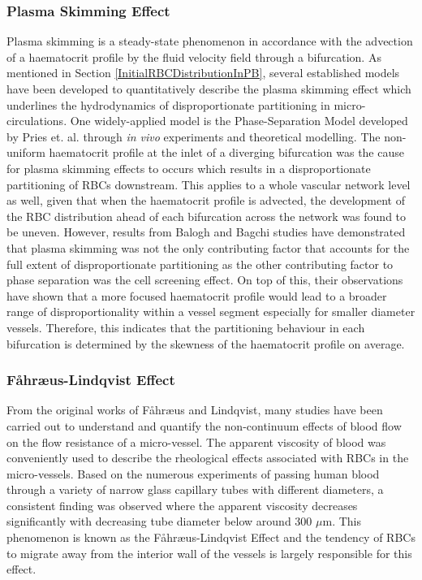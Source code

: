 \subsubsection{Plasma Skimming Effect}
\noindent Plasma skimming is a steady-state phenomenon in accordance with the advection of a haematocrit profile by the fluid velocity field through a bifurcation.\cite{YAN199117, EndenG1994ANSo} As mentioned in Section \ref{InitialRBCDistributionInPB}, several established models\cite{PRIES198981, GuibertR2010ANAt, Gould2015HematocritNetworks, LeeTae-Rin2017Gpsm} have been developed to quantitatively describe the plasma skimming effect which underlines the hydrodynamics of disproportionate partitioning in micro-circulations. One widely-applied model is the Phase-Separation Model developed by Pries et. al.\cite{PriesAR1990BFiM, A.R.Pries2005Mbvi} through \textit{in vivo} experiments and theoretical modelling. The non-uniform haematocrit profile at the inlet of a diverging bifurcation was the cause for plasma skimming effects to occurs which results in a disproportionate partitioning of RBCs downstream. This applies to a whole vascular network level as well, given that when the haematocrit profile is advected, the development of the RBC distribution ahead of each bifurcation across the network was found to be uneven.\cite{Balogh2017DirectNetworks} However, results from Balogh and Bagchi studies have demonstrated that plasma skimming was not the only contributing factor that accounts for the full extent of disproportionate partitioning as the other contributing factor to phase separation was the cell screening effect. On top of this, their observations have shown that a more focused haematocrit profile would lead to a broader range of disproportionality within a vessel segment especially for smaller diameter vessels.\cite{Balogh2018} Therefore, this indicates that the partitioning behaviour in each bifurcation is determined by the skewness of the haematocrit profile on average. 



\subsubsection{F{\aa}hr{\ae}us-Lindqvist Effect}
\noindent From the original works of F{\aa}hr{\ae}us and Lindqvist\cite{Fahrus1931THETUBES}, many studies\cite{Pries1992BloodHematocrit, Possenti2019, A.R.Pries2005Mbvi, VahidkhahKoohyar2016FoRB, Adjoua2019, McKayC.B1988OFaF, PRIESA.R1998Saas} have been carried out to understand and quantify the non-continuum effects of blood flow on the flow resistance of a micro-vessel. The apparent viscosity of blood was conveniently used to describe the rheological effects associated with RBCs in the micro-vessels. Based on the numerous experiments of passing human blood through a variety of narrow glass capillary tubes with different diameters, a consistent finding was observed where the apparent viscosity decreases significantly with decreasing tube diameter below around 300 $\mu$m. This phenomenon is known as the F{\aa}hr{\ae}us-Lindqvist Effect\cite{Fahrus1931THETUBES} and the tendency of RBCs to migrate away from the interior wall of the vessels is largely responsible for this effect.\cite{goldsmith1971red, goldsmith1989robin}

